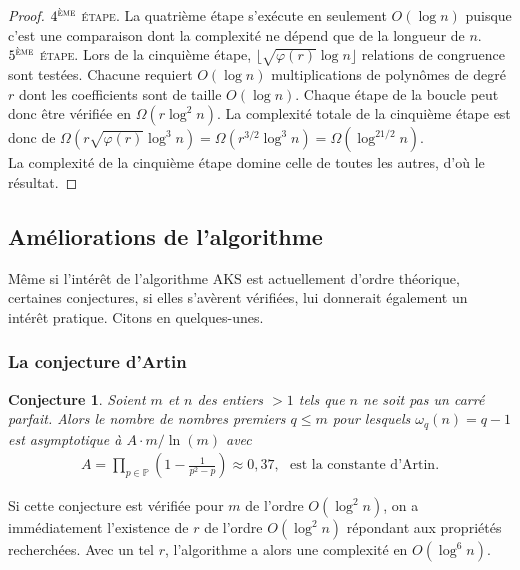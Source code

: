 \documentclass[11pt]{article}
\newtheorem{conject}{Conjecture}[subsection]
\begin{document}
\begin{small}
\begin{proof}
\noindent
$4^\textsc{ème}$ \textsc{étape}. La quatrième étape s'exécute en seulement $O(\log n)$ puisque c'est une comparaison dont la complexité ne dépend que de la longueur de $n$.\\

\noindent
$5^\textsc{ème}$ \textsc{étape}. Lors de la cinquième étape, $\lfloor \sqrt{\varphi(r)} \log n \rfloor$ relations de congruence sont testées. Chacune requiert $O(\log n)$ multiplications de polynômes de degré $r$ dont les coefficients sont de taille $O(\log n)$. Chaque étape de la boucle peut donc être vérifiée en $\Omega(r\log^2 n)$. La complexité totale de la cinquième étape est donc de $\Omega(r\sqrt{\varphi(r)} \log^3 n)=\Omega(r^{3/2} \log^3 n)=\Omega(\log^{21/2} n)$.\\

La complexité de la cinquième étape domine celle de toutes les autres, d'où le résultat.
\end{proof}
\end{small}

\subsection{Améliorations de l'algorithme}

Même si l'intérêt de l'algorithme AKS est actuellement d'ordre théorique, certaines conjectures, si elles s'avèrent vérifiées, lui donnerait également un intérêt pratique. Citons en quelques-unes.

\subsubsection{La conjecture d'Artin}

\begin{conject}
Soient $m$ et $n$ des entiers $>1$ tels que $n$ ne soit pas un carré parfait. Alors le nombre de nombres premiers $q \leqslant m$ pour lesquels $\omega_q(n)=q-1$ est asymptotique à $A \cdot m / \ln(m)$ avec
\begin{align*}
A= \prod_{p \in \mathbb{P}}^{} (1-\frac{1}{p^2-p}) \approx 0,37 , \ \ \ \text{est la constante d'Artin.}
\end{align*}
\end{conject}

Si cette conjecture est vérifiée pour $m$ de l'ordre $O(\log^2 n)$, on a immédiatement l'existence de $r$ de l'ordre $O(\log^2 n)$ répondant aux propriétés recherchées. Avec un tel $r$, l'algorithme a alors une complexité en $O(\log^6 n)$.\\
\end{document}
